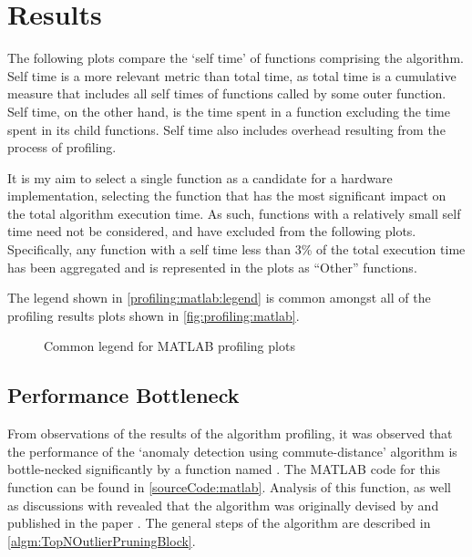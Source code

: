 \section{Results}
\label{software:algorithmProfiling:matlab:results}
The following plots compare the `self time' of functions comprising the
 algorithm. Self time is a more
relevant metric than total time, as total time is a cumulative measure that
includes all self times of functions called by some outer function. Self time,
on the other hand, is the time spent in a function excluding the time spent in
its child functions. Self time also includes overhead resulting from the process
of profiling.

It is my aim to select a single function as a candidate for a hardware
implementation, selecting the function that has the most significant impact on
the total algorithm execution time. As such, functions with a relatively small
self time need not be considered, and have excluded from the following plots.
Specifically, any function with a self time less than 3\% of the total execution
time has been aggregated and is represented in the plots as ``Other'' functions.

The legend shown in \autoref{profiling:matlab:legend} is common amongst all of
the  profiling results plots shown in
\autoref{fig:profiling:matlab}.

\begin{figure}
    \centering
    
    \caption{Common legend for MATLAB profiling plots}
    \label{profiling:matlab:legend}
\end{figure}


\subsection{Performance Bottleneck}
\label{algorithmPerformance:bottleneck}
From observations of the results of the algorithm profiling, it was observed
that the performance of the `anomaly detection using commute-distance' algorithm
is bottle-necked significantly by a function named
. The MATLAB code for this function can be
found in \autoref{sourceCode:matlab}. Analysis of this function, as well as
discussions with \citeauthor{Khoa:2012} revealed that the algorithm was
originally devised by \citeauthor{Bay:2003} and published in the paper
. The general steps of the algorithm are described in
\autoref{algm:TopNOutlierPruningBlock}.

